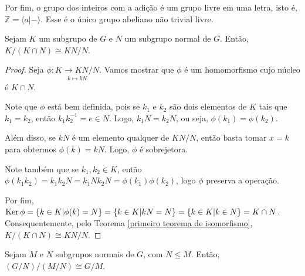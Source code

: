 	\par\vspace{0.3cm} Por fim, o grupo dos inteiros com a adição é um grupo livre em uma letra, isto é,
	$\mathbb{Z} = \langle a|- \rangle$. Esse é o único grupo abeliano não trivial livre.
	\begin{theorem}
	\label{segundo teorema de isomorfismos}
		Sejam $K$ um subgrupo de $G$ e $N$ um subgrupo normal de $G$. Então, $K/(K\cap N)\cong KN/N$.
	\end{theorem}
	\begin{proof}
		Seja $\phi:\underset{k\mapsto kN}{K\to KN/N}$. Vamos mostrar que $\phi$ é um homomorfismo cujo 
		núcleo é $K\cap N$.
		
		\par\vspace{0.3cm} Note que $\phi$ está bem definida, pois se $k_1$ e $k_2$ são dois elementos de 
		$K$ tais que $k_1=k_2$, então $k_1k_2^{-1} = e\in N$. Logo, $k_1N = k_2N$, 
		ou seja, $\phi(k_1)=\phi(k_2)$.	
		
		\par\vspace{0.3cm} Além disso, se $kN$ é um elemento qualquer de $KN/N$, então basta tomar $x=k$ 
		para obtermos $\phi(k)=kN$. Logo, $\phi$ é sobrejetora.
		
		\par\vspace{0.3cm} Note também que se $k_1,k_2\in K$, então
		$\phi(k_1k_2)=k_1k_2N=k_1Nk_2N=\phi(k_1)\phi(k_2)$, logo $\phi$ preserva a operação.
		
		\par\vspace{0.3cm} Por fim, $\operatorname{Ker}\phi= \{ k\in K | \phi(k) = N \} 
		= \{ k\in K | kN = N \}= \{ k\in K | k\in N \} = K\cap N$. Consequentemente, pelo 
		Teorema \eqref{primeiro teorema de isomorfismo},  $K/(K\cap N)\cong KN/N$.  
	\end{proof}
	\begin{theorem}
	\label{terceiro teorema de isomorfismos}
		Sejam $M$ e $N$ subgrupos normais de $G$, com $N\leq M$. Então, $(G/N)/(M/N)\cong G/M$.
	\end{theorem}

